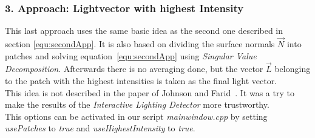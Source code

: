 \subsubsection{3. Approach: Lightvector with highest Intensity}\label{sec:appThree}
This last approach uses the same basic idea as the second one described in section \ref{equ:secondApp}. It is also based on dividing the surface normals $\vec{N}$ into patches and solving equation~\ref{equ:secondApp} using \textit{Singular Value Decomposition}. Afterwards there is no averaging done, but the vector $\vec{L}$ belonging to the patch with the highest intensities is taken as the final light vector. \\
This idea is not described in the paper of Johnson and Farid~\cite{Johnson}. It was a try to make the results of the \textit{Interactive Lighting Detector} more trustworthy. \\
This options can be activated in our script \textit{mainwindow.cpp} by setting \textit{usePatches} to \textit{true} and \textit{useHighestIntensity} to \textit{true}.


